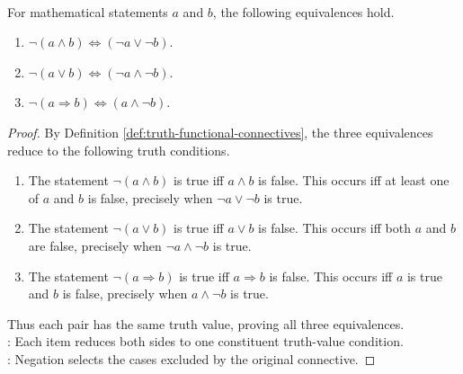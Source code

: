 \begin{proposition} \label{prop:negating-truth-functional-connectives} \\
For mathematical statements $a$ and $b$, the following equivalences hold.
\begin{enumerate}[label=(\roman*)]
\setlength{\itemsep}{0pt}
\item $\neg(a\land b)\Longleftrightarrow(\neg a\lor\neg b)$.
\item $\neg(a\lor b)\Longleftrightarrow(\neg a\land\neg b)$.
\item $\neg(a\Rightarrow b)\Longleftrightarrow(a\land\neg b)$.
\end{enumerate}
\begin{proof}
By Definition \ref{def:truth-functional-connectives}, the three equivalences reduce to the following truth conditions.
\begin{enumerate}[label=(\roman*)]
\setlength{\itemsep}{0pt}
\item The statement $\neg(a\land b)$ is true iff $a\land b$ is false. This occurs iff at least one of $a$ and $b$ is false, precisely when $\neg a\lor\neg b$ is true.
\item The statement $\neg(a\lor b)$ is true iff $a\lor b$ is false. This occurs iff both $a$ and $b$ are false, precisely when $\neg a\land\neg b$ is true.
\item The statement $\neg(a\Rightarrow b)$ is true iff $a\Rightarrow b$ is false. This occurs iff $a$ is true and $b$ is false, precisely when $a\land\neg b$ is true.
\end{enumerate}
Thus each pair has the same truth value, proving all three equivalences.\\
: Each item reduces both sides to one constituent truth-value condition.\\
: Negation selects the cases excluded by the original connective.
\end{proof}
\end{proposition}
